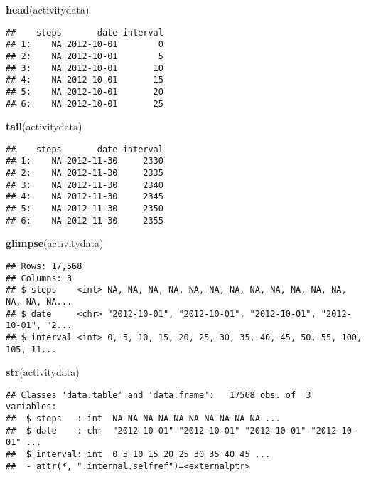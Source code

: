 \documentclass[
]{article}
\newenvironment{Shaded}{\begin{snugshade}}{\end{snugshade}}
\newcommand{\KeywordTok}[1]{\textcolor[rgb]{0.13,0.29,0.53}{\textbf{#1}}}
\newcommand{\NormalTok}[1]{#1}
\begin{document}
\begin{Shaded}
\begin{Highlighting}[]
\KeywordTok{head}\NormalTok{(activitydata)}
\end{Highlighting}
\end{Shaded}

\begin{verbatim}
##    steps       date interval
## 1:    NA 2012-10-01        0
## 2:    NA 2012-10-01        5
## 3:    NA 2012-10-01       10
## 4:    NA 2012-10-01       15
## 5:    NA 2012-10-01       20
## 6:    NA 2012-10-01       25
\end{verbatim}

\begin{Shaded}
\begin{Highlighting}[]
\KeywordTok{tail}\NormalTok{(activitydata)}
\end{Highlighting}
\end{Shaded}

\begin{verbatim}
##    steps       date interval
## 1:    NA 2012-11-30     2330
## 2:    NA 2012-11-30     2335
## 3:    NA 2012-11-30     2340
## 4:    NA 2012-11-30     2345
## 5:    NA 2012-11-30     2350
## 6:    NA 2012-11-30     2355
\end{verbatim}

\begin{Shaded}
\begin{Highlighting}[]
\KeywordTok{glimpse}\NormalTok{(activitydata)}
\end{Highlighting}
\end{Shaded}

\begin{verbatim}
## Rows: 17,568
## Columns: 3
## $ steps    <int> NA, NA, NA, NA, NA, NA, NA, NA, NA, NA, NA, NA, NA, NA, NA...
## $ date     <chr> "2012-10-01", "2012-10-01", "2012-10-01", "2012-10-01", "2...
## $ interval <int> 0, 5, 10, 15, 20, 25, 30, 35, 40, 45, 50, 55, 100, 105, 11...
\end{verbatim}

\begin{Shaded}
\begin{Highlighting}[]
\KeywordTok{str}\NormalTok{(activitydata)}
\end{Highlighting}
\end{Shaded}

\begin{verbatim}
## Classes 'data.table' and 'data.frame':   17568 obs. of  3 variables:
##  $ steps   : int  NA NA NA NA NA NA NA NA NA NA ...
##  $ date    : chr  "2012-10-01" "2012-10-01" "2012-10-01" "2012-10-01" ...
##  $ interval: int  0 5 10 15 20 25 30 35 40 45 ...
##  - attr(*, ".internal.selfref")=<externalptr>
\end{verbatim}
\end{document}
